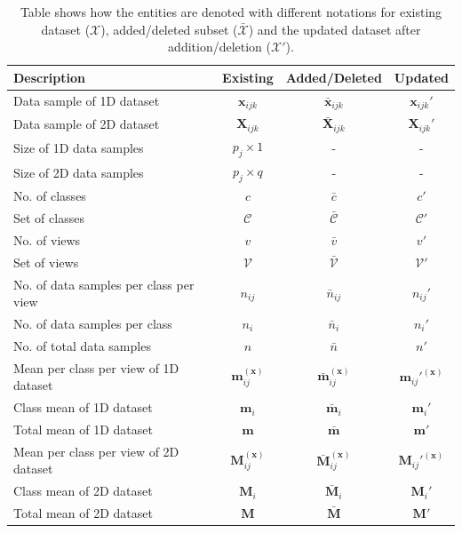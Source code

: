 \begin{table}[t]
	\centering
	\caption{Table shows how the entities are denoted with different notations for existing dataset ($\mathcal{X}$), added/deleted subset ($\bar{\mathcal{X}}$) and the updated dataset after addition/deletion ($\mathcal{X}'$).}
	\label{tab:Notations}
		\begin{tabular}{l c c c} \toprule
		Description & Existing & Added/Deleted & Updated \\
		\toprule
		Data sample of 1D dataset & $\textbf{x}_{ijk}$ & $\bar{\textbf{x}}_{ijk}$ & $\textbf{x}_{ijk}'$ \\[0.2cm]
		Data sample of 2D dataset & $\textbf{X}_{ijk}$ & $\bar{\textbf{X}}_{ijk}$ & $\textbf{X}_{ijk}'$ \\[0.2cm]
		Size of 1D data samples & $p_j \times 1$ & - & - \\[0.2cm]
		Size of 2D data samples & $p_j \times q$ & - & - \\[0.2cm]
		No. of classes & $c$ & $\bar{c}$ & $c'$ \\[0.2cm]
		Set of classes & $\mathcal{C}$ & $\bar{\mathcal{C}}$ & $\mathcal{C}'$ \\[0.2cm]
		No. of views & $v$ & $\bar{v}$ & $v'$ \\[0.2cm]
		Set of views & $\mathcal{V}$ & $\bar{\mathcal{V}}$ & $\mathcal{V}'$ \\[0.2cm]
		No. of data samples per class per view & $n_{ij}$ & $\bar{n}_{ij}$ & $n_{ij}'$ \\[0.2cm]
		No. of data samples per class & $n_{i}$ & $\bar{n}_{i}$ & $n_{i}'$ \\[0.2cm]
		No. of total data samples & $n$ & $\bar{n}$ & $n'$ \\[0.2cm]
		Mean per class per view of 1D dataset & $\textbf{m}_{ij}^{(\textbf{x})}$ & $\bar{\textbf{m}}_{ij}^{(\textbf{x})}$ & ${\textbf{m}_{ij}'}^{(\textbf{x})}$ \\[0.2cm]
		Class mean of 1D dataset & $\textbf{m}_{i}$ & $\bar{\textbf{m}}_{i}$ & $\textbf{m}_{i}'$ \\[0.2cm]
		Total mean of 1D dataset & $\textbf{m}$ & $\bar{\textbf{m}}$ & $\textbf{m}'$ \\[0.2cm]
		Mean per class per view of 2D dataset & $\textbf{M}_{ij}^{(\textbf{x})}$ & $\bar{\textbf{M}}_{ij}^{(\textbf{x})}$ & ${\textbf{M}_{ij}'}^{(\textbf{x})}$ \\[0.2cm]
		Class mean of 2D dataset & $\textbf{M}_{i}$ & $\bar{\textbf{M}}_{i}$ & $\textbf{M}_{i}'$ \\[0.2cm]
		Total mean of 2D dataset & $\textbf{M}$ & $\bar{\textbf{M}}$ & $\textbf{M}'$ \\[0.2cm]

\end{tabular}
\end{table}
